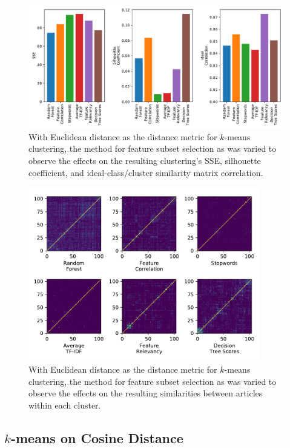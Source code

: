 \documentclass[11pt]{article}
\begin{document}
\begin{figure} \label{fig:something}
  \centering
  \includegraphics[height=0.3\textheight]{figures/hw3/euclidean/feature_subset_selection}
  \caption{With Euclidean distance as the distance metric for $k$-means clustering, the method for feature subset selection as was varied to observe the effects on the resulting clustering's SSE, silhouette coefficient, and ideal-class/cluster similarity matrix correlation.}
\end{figure}

\begin{figure} \label{fig:something}
  \centering
  \includegraphics[width=0.9\textwidth]{figures/hw3/euclidean/similarity_matrices}
  \caption{With Euclidean distance as the distance metric for $k$-means clustering, the method for feature subset selection as was varied to observe the effects on the resulting similarities between articles within each cluster.}
\end{figure}


\subsection{$k$-means on Cosine Distance}
\end{document}
